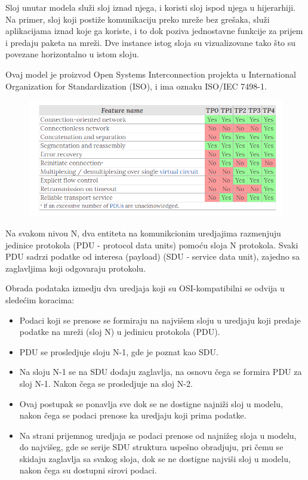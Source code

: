 \documentclass[a4paper,12pt, master]{etf}
\begin{document}
	Sloj unutar modela slu\v{z}i sloj iznad njega, i koristi sloj ispod njega u
	hijerarhiji. Na	primer, sloj koji posti\v{z}e komunikaciju preko mre\v{z}e
	bez gre\v{s}aka, slu\v{z}i aplikacijama iznad koje ga koriste, i to dok
	poziva jednostavne funkcije za prijem i predaju paketa na mre\v{z}i.
	Dve instance istog sloja su vizualizovane tako \v{s}to su povezane
	horizontalno u istom sloju.

	Ovaj model je proizvod Open Systems Interconnection projekta u
	International Organization for Standardization (ISO), i ima oznaku ISO/IEC
	7498-1.

	\begin{figure}[htb]
			\centering
			\includegraphics[scale=.43]{../pic/tp_classes.png}
			\label{fig:tp_classes}
	\end{figure}

	Na svakom nivou N, dva entiteta na komunikcionim uredjajima razmenjuju
	jedinice protokola (PDU - protocol data units) pomo\'{c}u sloja N
	protokola. Svaki PDU sadrzi podatke od interesa	(payload) (SDU - service
	data unit), zajedno sa zaglavljima koji odgovaraju protokolu.

	Obrada podataka izmedju dva uredjaja koji su OSI-kompatibilni se odvija u
	slede\'{c}im koracima:

	\begin{itemize}
		\item Podaci koji se prenose se formiraju na najvi\v{s}em sloju u
		uredjaju koji predaje podatke na mre\v{z}i (sloj N) u jedinicu
		protokola (PDU).
		\item PDU se prosledjuje sloju N-1, gde je poznat kao SDU.
		\item Na sloju N-1 se na SDU dodaju zaglavlja, na osnovu \v{c}ega se
		formira PDU za sloj N-1. Nakon \v{c}ega se prosledjuje na sloj N-2.
		\item Ovaj postupak se ponavlja sve dok se ne dostigne najni\v{z}i sloj
		u modelu, nakon	\v{c}ega se podaci prenose ka uredjaju koji prima
		podatke.
		\item Na strani prijemnog uredjaja se podaci prenose od najni\v{z}eg
		sloja u modelu, do najvi\v{s}eg, gde se serije SDU struktura
		uspe\v{s}no obradjuju, pri \v{c}emu se skidaju zaglavlja sa svakog
		sloja, dok se ne dostigne najvi\v{s}i sloj u modelu, nakon \v{c}ega su
		dostupni sirovi podaci.
	\end{itemize}
\end{document}
